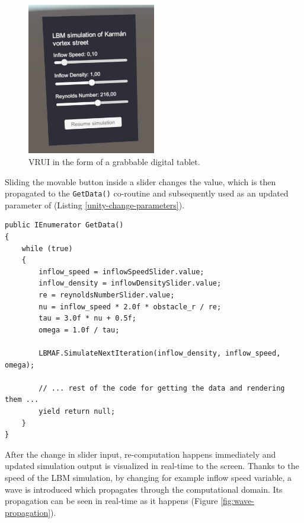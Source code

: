 \begin{figure}[!ht]
	\centering
	\includegraphics[width=0.5\textwidth]{figures/vrui.jpeg}
	\caption{VRUI in the form of a grabbable digital tablet.}
	\label{fig:vrui}
\end{figure}

Sliding the movable button inside a slider changes the value, which is then propagated to the \texttt{GetData()} co-routine and subsequently used as an updated parameter of  (Listing \ref{unity-change-parameters}).

\begin{lstlisting}[language=Csharp, caption=Implementation of the re-computing of the simulation each frame based on values from user input through VRUI (sliders)., label=unity-change-parameters]
public IEnumerator GetData()
{
	while (true)
	{
		inflow_speed = inflowSpeedSlider.value;
		inflow_density = inflowDensitySlider.value;
		re = reynoldsNumberSlider.value;
		nu = inflow_speed * 2.0f * obstacle_r / re;
		tau = 3.0f * nu + 0.5f;
		omega = 1.0f / tau;
		
		LBMAF.SimulateNextIteration(inflow_density, inflow_speed, omega);
		
		// ... rest of the code for getting the data and rendering them ...
		yield return null;
	}
}
\end{lstlisting}

After the change in slider input, re-computation happens immediately and updated simulation output is visualized in real-time to the screen. Thanks to the speed of the LBM simulation, by changing for example inflow speed variable, a wave is introduced which propagates through the computational domain. Its propagation can be seen in real-time as it happens (Figure \ref{fig:wave-propagation}).

